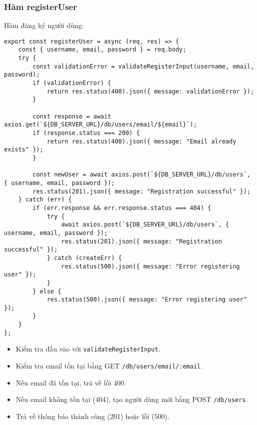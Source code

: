             \subsubsection{Hàm registerUser}
                \hspace*{0.6cm}Hàm đăng ký người dùng:
                \begin{lstlisting}
export const registerUser = async (req, res) => {
    const { username, email, password } = req.body;
    try {
        const validationError = validateRegisterInput(username, email, password);
        if (validationError) {
            return res.status(400).json({ message: validationError });
        }

        const response = await axios.get(`${DB_SERVER_URL}/db/users/email/${email}`);
        if (response.status === 200) {
            return res.status(400).json({ message: "Email already exists" });
        }

        const newUser = await axios.post(`${DB_SERVER_URL}/db/users`, { username, email, password });
        res.status(201).json({ message: "Registration successful" });
    } catch (err) {
        if (err.response && err.response.status === 404) {
            try {
                await axios.post(`${DB_SERVER_URL}/db/users`, { username, email, password });
                res.status(201).json({ message: "Registration successful" });
            } catch (createErr) {
                res.status(500).json({ message: "Error registering user" });
            }
        } else {
            res.status(500).json({ message: "Error registering user" });
        }
    }
};
            \end{lstlisting}
                \begin{itemize}
                    \item Kiểm tra đầu vào với \texttt{validateRegisterInput}.
                    \item Kiểm tra email tồn tại bằng GET \texttt{/db/users/email/:email}.
                    \item Nếu email đã tồn tại, trả về lỗi 400.
                    \item Nếu email không tồn tại (404), tạo người dùng mới bằng POST \texttt{/db/users}.
                    \item Trả về thông báo thành công (201) hoặc lỗi (500).
                \end{itemize}

